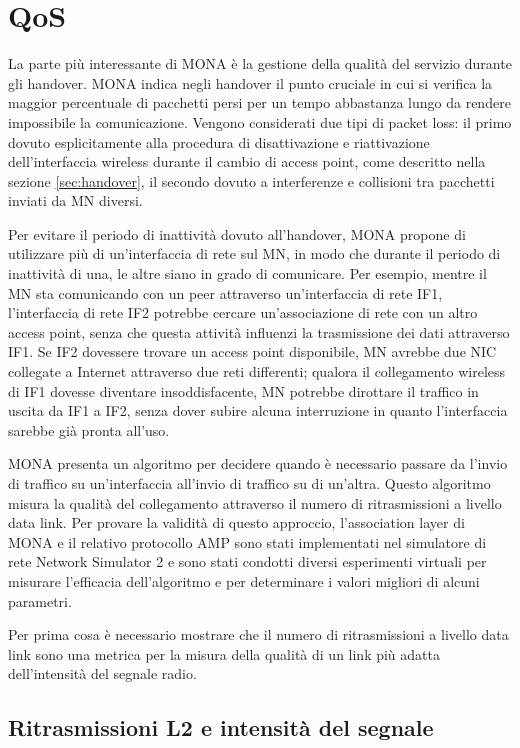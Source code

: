 \documentclass[12pt,a4paper,openright,twoside]{book}
\begin{document}
\section{QoS}
\label{sec:mona:qos}

La parte più interessante di MONA è la gestione della qualità del
servizio durante gli handover. MONA indica negli handover il punto
cruciale in cui si verifica la maggior percentuale di pacchetti persi
per un tempo abbastanza lungo da rendere impossibile la
comunicazione. Vengono considerati due tipi di packet loss: il primo
dovuto esplicitamente alla procedura di disattivazione e riattivazione
dell'interfaccia wireless durante il cambio di access point, come
descritto nella sezione \ref{sec:handover}, il secondo dovuto a
interferenze e collisioni tra pacchetti inviati da MN diversi.

Per evitare il periodo di inattività dovuto all'handover, MONA propone
di utilizzare più di un'interfaccia di rete sul MN, in modo che
durante il periodo di inattività di una, le altre siano in grado di
comunicare. Per esempio, mentre il MN sta comunicando con un peer
attraverso un'interfaccia di rete IF1, l'interfaccia di rete IF2
potrebbe cercare un'associazione di rete con un altro access point,
senza che questa attività influenzi la trasmissione dei dati
attraverso IF1. Se IF2 dovessere trovare un access point disponibile,
MN avrebbe due NIC collegate a Internet attraverso due reti
differenti; qualora il collegamento wireless di IF1 dovesse diventare
insoddisfacente, MN potrebbe dirottare il traffico in uscita da IF1 a
IF2, senza dover subire alcuna interruzione in quanto l'interfaccia
sarebbe già pronta all'uso.

MONA presenta un algoritmo per decidere quando è necessario passare
da l'invio di traffico su un'interfaccia all'invio di traffico su di
un'altra. Questo algoritmo misura la qualità del collegamento
attraverso il numero di ritrasmissioni a livello data link. Per
provare la validità di questo approccio, l'association layer di MONA e
il relativo protocollo AMP sono stati implementati nel simulatore di
rete Network Simulator 2 e sono stati condotti diversi esperimenti
virtuali per misurare l'efficacia dell'algoritmo e per determinare i
valori migliori di alcuni parametri.

Per prima cosa è necessario mostrare che il numero di ritrasmissioni a
livello data link sono una metrica per la misura della qualità di un
link più adatta dell'intensità del segnale radio.

\subsection{Ritrasmissioni L2 e intensità del segnale}
\end{document}
